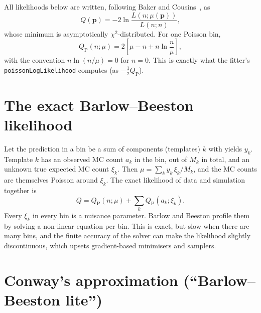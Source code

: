 \documentclass[11pt,a4paper]{article}
\newcommand{\QP}{Q_{\mathrm{P}}}
\newcommand{\code}[1]{\texttt{#1}}
\begin{document}
All likelihoods below are written, following Baker and Cousins~\cite{BakerCousins}, as
\begin{equation}
  Q(\bm p) = -2\ln\frac{L(n;\mu(\bm p))}{L(n;n)},
\end{equation}
whose minimum is asymptotically $\chi^2$-distributed. For one Poisson bin,
\begin{equation}
  \QP(n;\mu) = 2\left[\mu - n + n\ln\frac{n}{\mu}\right] ,
\end{equation}
with the convention $n\ln(n/\mu)=0$ for $n=0$. This is exactly what the fitter's
\code{poissonLogLikelihood} computes (as $-\tfrac12\QP$).

\section{The exact Barlow--Beeston likelihood}

Let the prediction in a bin be a sum of components (templates) $k$ with yields $y_k$. Template $k$
has an observed MC count $a_k$ in the bin, out of $M_k$ in total, and an unknown true expected MC
count $\xi_k$. Then $\mu = \sum_k y_k\,\xi_k/M_k$, and the MC counts are themselves Poisson
around $\xi_k$. The exact likelihood of data and simulation together is~\cite{BB,DA}
\begin{equation}
  Q = \QP(n;\mu) + \sum_k \QP(a_k;\xi_k).
  \label{eq:bb}
\end{equation}
Every $\xi_k$ in every bin is a nuisance parameter. Barlow and Beeston profile them by solving a
non-linear equation per bin. This is exact, but slow when there are many bins, and the finite
accuracy of the solver can make the likelihood slightly discontinuous, which upsets gradient-based
minimisers and samplers.

\section{Conway's approximation (``Barlow--Beeston lite'')}
\end{document}
